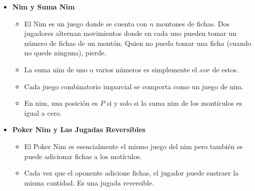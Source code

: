 \begin{itemize}
    \item{
		\textbf{Nim y Suma Nim}
		\begin{itemize}
			\item{
				El Nim es un juego donde se cuenta con $n$ montones de fichas. Dos jugadores alternan movimientos 
				donde en cada uno pueden tomar un n\'umero de fichas de un mont\'on. Quien no pueda tomar una ficha 
				(cuando no quede ninguna), pierde.
			}
			\item{
				La suma nim de uno o varios n\'umeros es simplemente el $xor$ de estos. 
			}
			\item{
				Cada juego combinatorio imparcial se comporta como un juego de nim.
			}
			\item{
				En nim, una posici\'on es $P$ si y solo si la suma nim de los mont\'iculos es igual a cero.
			}
		\end{itemize}
    }
    
    \item{
		\textbf{Poker Nim y Las Jugadas Reversibles}
		\begin{itemize}
			\item{
				El Poker Nim es esencialmente el mismo juego del nim pero tambi\'en se puede adicionar fichas a los mot\'iculos. 
			}
			\item{
				Cada vez que el oponente adicione fichas, el jugador puede sustraer la misma cantidad. Es una jugada reversible.
			}
		\end{itemize}
    }
    

\end{itemize}
